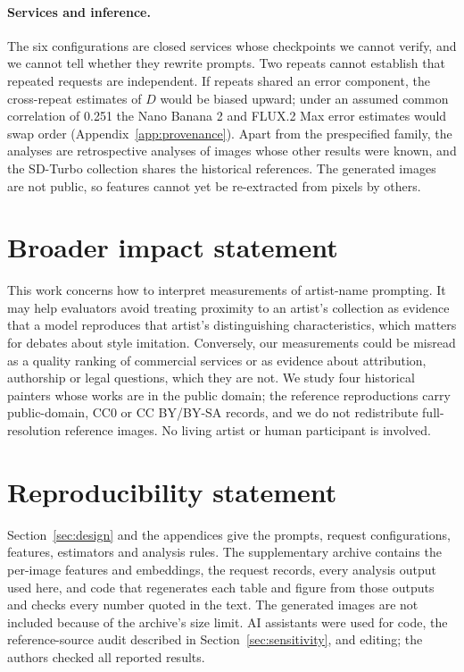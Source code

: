 \documentclass[10pt]{article}
\begin{document}
\paragraph{Services and inference.} The six configurations are closed services whose
checkpoints we cannot verify, and we cannot tell whether they rewrite prompts. Two repeats
cannot establish that repeated requests are independent. If repeats shared an error component,
the cross-repeat estimates of $D$ would be biased upward; under an assumed common correlation
of 0.251 the Nano Banana 2 and FLUX.2 Max error estimates would swap order
(Appendix~\ref{app:provenance}). Apart from the prespecified family, the analyses are
retrospective analyses of images whose other results were known, and the SD-Turbo collection
shares the historical references. The generated images are not public, so features cannot yet
be re-extracted from pixels by others.

\section*{Broader impact statement}
This work concerns how to interpret measurements of artist-name prompting. It may help
evaluators avoid treating proximity to an artist's collection as evidence that a model
reproduces that artist's distinguishing characteristics, which matters for debates about style
imitation. Conversely, our measurements could be misread as a quality ranking of commercial
services or as evidence about attribution, authorship or legal questions, which they are not.
We study four historical painters whose works are in the public domain; the reference
reproductions carry public-domain, CC0 or CC BY/BY-SA records, and we do not redistribute
full-resolution reference images. No living artist or human participant is involved.

\section*{Reproducibility statement}
Section~\ref{sec:design} and the appendices give the prompts, request configurations, features,
estimators and analysis rules. The supplementary archive contains the per-image features and
embeddings, the request records, every analysis output used here, and code that regenerates each
table and figure from those outputs and checks every number quoted in the text. The generated
images are not included because of the archive's size limit. AI assistants were used for code,
the reference-source audit described in Section~\ref{sec:sensitivity}, and editing; the authors
checked all reported results.




\clearpage
\appendix

\end{document}
